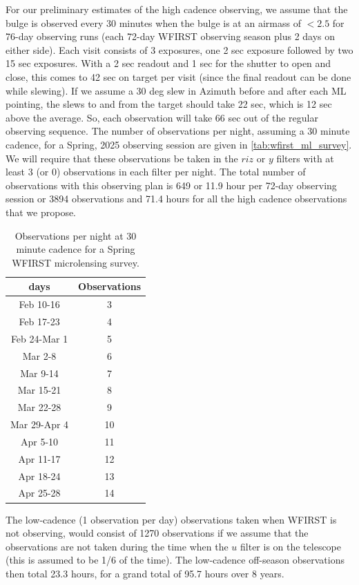 For our preliminary estimates of the high cadence observing, we assume
that the bulge is observed every 30 minutes when the bulge is at
an airmass of $< 2.5$ for 76-day observing runs (each 72-day WFIRST observing
season plus 2 days on either side). Each visit consists of 3 exposures,
one 2 sec exposure followed by two 15 sec exposures. With a 2 sec readout
and 1 sec for the shutter to open and close, this comes to 42 sec on target
per visit (since the final readout can be done while slewing).
If we assume a 30 deg slew in Azimuth before and after each ML pointing, the slews
to and from the target should take 22 sec, which is 12 sec above the average. So,
each observation will take 66 sec out of the regular observing sequence.
The number of observations per night, assuming a 30 minute cadence, for
a Spring, 2025 observing session are given in \autoref{tab:wfirst_ml_survey}. We will require
that these observations be taken in the $riz$ or $y$ filters with at
least 3 (or 0) observations in each filter per night. The total number
of observations with this observing plan is 649 or 11.9 hour per
72-day observing session or 3894 observations and 71.4 hours for
all the high cadence observations that we propose.

\begin{table}
\begin{tabular}{ c c }
{\bf days} & {\bf Observations} \\
\hline
Feb 10-16     &  3 \\
Feb 17-23     &  4 \\
Feb 24-Mar 1  &  5 \\
Mar 2-8       &  6 \\
Mar 9-14      &  7 \\
Mar 15-21     &  8 \\
Mar 22-28     &  9 \\
Mar 29-Apr 4  & 10 \\
Apr 5-10      & 11 \\
Apr 11-17     & 12 \\
Apr 18-24     & 13 \\
Apr 25-28     & 14 \\
\end{tabular}
\caption{Observations per night at 30 minute cadence for a Spring
WFIRST microlensing survey.}
\label{tab:wfirst_ml_survey}
\end{table}

The low-cadence (1 observation per day) observations taken when WFIRST
is not observing, would consist of 1270 observations if we assume that
the observations are not taken during the time when the $u$ filter is
on the telescope (this is assumed to be 1/6 of the time). The low-cadence
off-season observations then total 23.3 hours, for a grand total of
95.7 hours over 8 years.

